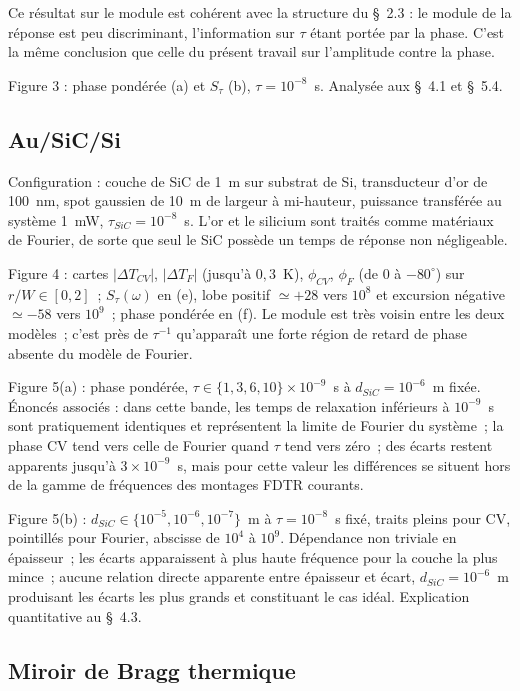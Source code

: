 \documentclass[11pt,a4paper]{article}
\begin{document}
Ce résultat sur le module est cohérent avec la structure du §~2.3 : le module de la réponse est
peu discriminant, l'information sur $\tau$ étant portée par la phase. C'est la même conclusion
que celle du présent travail sur l'amplitude contre la phase.

Figure 3 : phase pondérée (a) et $S_\tau$ (b), $\tau = 10^{-8}$~s. Analysée aux §~4.1 et §~5.4.

\subsection{Au/SiC/Si}

Configuration : couche de SiC de 1~\textmu m sur substrat de Si, transducteur d'or de 100~nm,
spot gaussien de 10~\textmu m de largeur à mi-hauteur, puissance transférée au système 1~mW,
$\tau_{SiC} = 10^{-8}$~s. L'or et le silicium sont traités comme matériaux de Fourier, de sorte
que seul le SiC possède un temps de réponse non négligeable.

Figure 4 : cartes $|\Delta T_{CV}|$, $|\Delta T_F|$ (jusqu'à $0{,}3$~K), $\phi_{CV}$, $\phi_F$
(de $0$ à $-80^\circ$) sur $r/W \in [0,2]$~; $S_\tau(\omega)$ en (e), lobe positif
$\simeq +28$ vers $10^8$ et excursion négative $\simeq -58$ vers $10^9$~; phase pondérée en (f).
Le module est très voisin entre les deux modèles~; c'est près de $\tau^{-1}$ qu'apparaît une
forte région de retard de phase absente du modèle de Fourier.

Figure 5(a) : phase pondérée, $\tau \in \{1, 3, 6, 10\}\times 10^{-9}$~s à
$d_{SiC} = 10^{-6}$~m fixée. Énoncés associés : dans cette bande, les temps de relaxation
inférieurs à $10^{-9}$~s sont pratiquement identiques et représentent la limite de Fourier du
système~; la phase CV tend vers celle de Fourier quand $\tau$ tend vers zéro~; des écarts
restent apparents jusqu'à $3\times10^{-9}$~s, mais pour cette valeur les différences se situent
hors de la gamme de fréquences des montages FDTR courants.

Figure 5(b) : $d_{SiC} \in \{10^{-5}, 10^{-6}, 10^{-7}\}$~m à $\tau = 10^{-8}$~s fixé, traits
pleins pour CV, pointillés pour Fourier, abscisse de $10^4$ à $10^9$. Dépendance non triviale en
épaisseur~; les écarts apparaissent à plus haute fréquence pour la couche la plus mince~; aucune
relation directe apparente entre épaisseur et écart, $d_{SiC} = 10^{-6}$~m produisant les écarts
les plus grands et constituant le cas idéal. Explication quantitative au §~4.3.

\subsection{Miroir de Bragg thermique}
\end{document}
